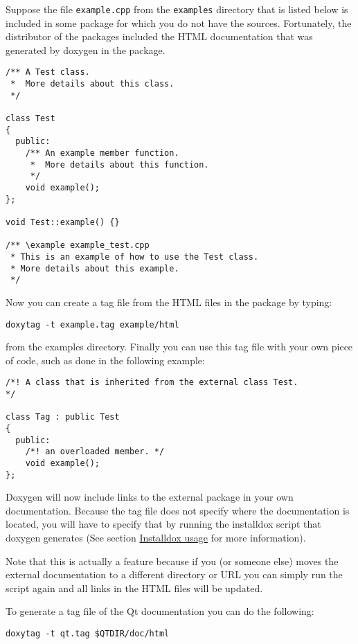 \begin{Desc}
\item[Example 1:]Suppose the file {\tt example.cpp} from the {\tt examples} directory that is listed below is included in some package for which you do not have the sources. Fortunately, the distributor of the packages included the HTML documentation that was generated by doxygen in the package. 

\begin{VerbInclude}\begin{verbatim}/** A Test class.
 *  More details about this class.
 */

class Test
{
  public:
    /** An example member function.
     *  More details about this function.
     */
    void example();
};

void Test::example() {}

/** \example example_test.cpp
 * This is an example of how to use the Test class.
 * More details about this example.
 */
\end{verbatim}
\end{VerbInclude}
 Now you can create a tag file from the HTML files in the package by typing: 

\footnotesize\begin{verbatim}
doxytag -t example.tag example/html
\end{verbatim}
\normalsize
 from the examples directory. Finally you can use this tag file with your own piece of code, such as done in the following example: 

\begin{VerbInclude}\begin{verbatim}/*! A class that is inherited from the external class Test.
*/

class Tag : public Test
{
  public:
    /*! an overloaded member. */
    void example();
};
\end{verbatim}
\end{VerbInclude}
 Doxygen will now include links to the external package in your own documentation. Because the tag file does not specify where the documentation is located, you will have to specify that by running the installdox script that doxygen generates (See section \hyperlink{installdox_usage}{Installdox usage} for more information).\end{Desc}
Note that this is actually a feature because if you (or someone else) moves the external documentation to a different directory or URL you can simply run the script again and all links in the HTML files will be updated.



\begin{Desc}
\item[Example 2:]To generate a tag file of the Qt documentation you can do the following: 

\footnotesize\begin{verbatim}
doxytag -t qt.tag $QTDIR/doc/html
\end{verbatim}
\normalsize
 \end{Desc}
